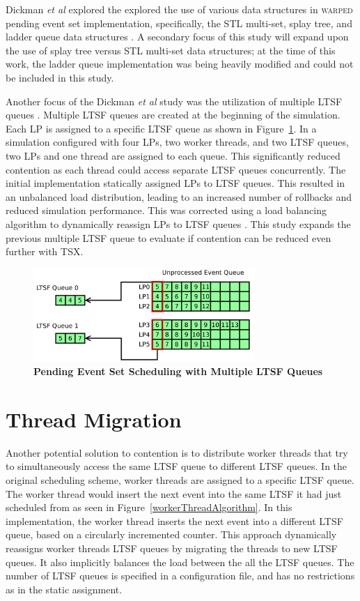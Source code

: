\documentclass[11pt]{book}
\begin{document}
Dickman \emph{et al} explored the explored the use of various data structures in
\textsc{warped} pending event set implementation, specifically, the STL multi-set, splay
tree, and ladder queue data structures \cite{dickman}.  A secondary focus of this study
will expand upon the use of splay tree versus STL multi-set data structures; at the time
of this work, the ladder queue implementation was being heavily modified and could not be
included in this study.

Another focus of the Dickman \emph{et al} study was the utilization of multiple LTSF
queues \cite{dickman}.  Multiple LTSF queues are created at the beginning of the
simulation.  Each LP is assigned to a specific LTSF queue as shown in
Figure~\ref{fig:multipleLTSF}.  In a simulation configured with four LPs, two worker
threads, and two LTSF queues, two LPs and one thread are assigned to each queue.  This
significantly reduced contention as each thread could access separate LTSF queues
concurrently.  The initial implementation statically assigned LPs to LTSF queues.  This
resulted in an unbalanced load distribution, leading to an increased number of rollbacks
and reduced simulation performance.  This was corrected using a load balancing algorithm
to dynamically reassign LPs to LTSF queues \cite{dickman}.  This study expands the
previous multiple LTSF queue to evaluate if contention can be reduced even further with
TSX.

\begin{figure}
    \centering
    \graphicspath{ {./figures/} }
    \includegraphics[width=0.75\textwidth,keepaspectratio]{multiple_ltsf}
    \caption{\textbf{Pending Event Set Scheduling with Multiple LTSF
        Queues}}\label{fig:multipleLTSF}
\end{figure}

\section{Thread Migration}

Another potential solution to contention is to distribute worker threads that try to
simultaneously access the same LTSF queue to different LTSF queues.  In the original
scheduling scheme, worker threads are assigned to a specific LTSF queue.  The worker
thread would insert the next event into the same LTSF it had just scheduled from as seen
in Figure~\ref{workerThreadAlgorithm}.  In this implementation, the worker thread inserts
the next event into a different LTSF queue, based on a circularly incremented counter.
This approach dynamically reassigns worker threads LTSF queues by migrating the threads to
new LTSF queues.  It also implicitly balances the load between the all the LTSF queues.
The number of LTSF queues is specified in a configuration file, and has no restrictions as
in the static assignment.
\end{document}
